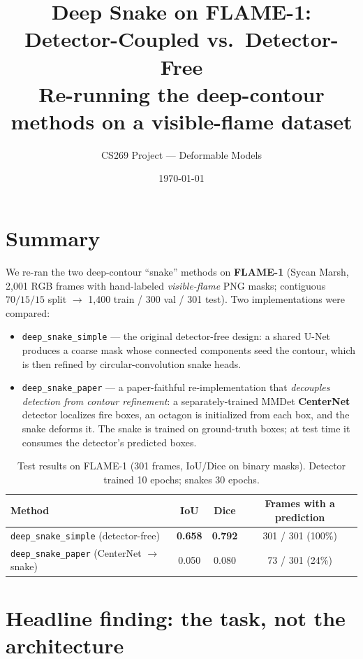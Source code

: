 \documentclass[10pt]{article}
\title{\vspace{-2.5em}Deep Snake on FLAME-1: Detector-Coupled vs.\ Detector-Free\\
\large Re-running the deep-contour methods on a visible-flame dataset}
\author{CS269 Project --- Deformable Models}
\date{\today}
\begin{document}
\maketitle
\vspace{-1.5em}

\section{Summary}

We re-ran the two deep-contour ``snake'' methods on \textbf{FLAME-1} (Sycan Marsh,
2{,}001 RGB frames with hand-labeled \emph{visible-flame} PNG masks; contiguous
$70/15/15$ split $\to$ 1{,}400 train / 300 val / 301 test). Two implementations
were compared:

\begin{itemize}
\item \texttt{deep\_snake\_simple} --- the original detector-free design: a shared
  U-Net produces a coarse mask whose connected components seed the contour, which
  is then refined by circular-convolution snake heads.
\item \texttt{deep\_snake\_paper} --- a paper-faithful re-implementation that
  \emph{decouples detection from contour refinement}: a separately-trained MMDet
  \textbf{CenterNet} detector localizes fire boxes, an octagon is initialized from
  each box, and the snake deforms it. The snake is trained on ground-truth boxes;
  at test time it consumes the detector's predicted boxes.
\end{itemize}

\begin{table}[H]
\centering
\caption{Test results on FLAME-1 (301 frames, IoU/Dice on binary masks).
Detector trained 10 epochs; snakes 30 epochs.}
\begin{tabular}{lccc}
\toprule
Method & IoU & Dice & Frames with a prediction \\
\midrule
\texttt{deep\_snake\_simple} (detector-free) & \textbf{0.658} & \textbf{0.792} & 301 / 301 (100\%) \\
\texttt{deep\_snake\_paper} (CenterNet $\to$ snake) & 0.050 & 0.080 & 73 / 301 (24\%) \\
\bottomrule
\end{tabular}
\end{table}

\section{Headline finding: the task, not the architecture}
\end{document}
